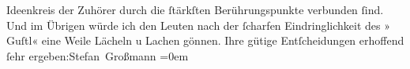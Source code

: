 \begin{ledgroupsized}[t]{13cm}
               Ideenkreis der Zuhörer \introOben{}durch\introOben{} die ſtärkſten  Berührungspunkte verbunden ſind.\pend
           \pstart
           Und im Übrigen würde ich den Leuten nach der ſcharfen Eindringlichkeit des »\label{T_L01717-2v}\label{T_L01717-2h} Guſtl«
               eine  Weile Lächeln u Lachen gönnen.\pend
           \pstart
           Ihre gütige Entſcheidungen erhoffend{\\[\baselineskip]}ſehr ergeben:\spacefill\mbox{Stefan
                  Großmann}\pend
           \leftskip=0em{}
         
         \endnumbering{}\end{ledgroupsized}  \newcommand{\dateiname}{L01717}\newcommand{\titel}{Stefan Großmann an Arthur Schnitzler, 7. 10. 1907}\newcommand{\editorInnen}{ Martin Anton Müller und Gerd-Hermann Susen}
      